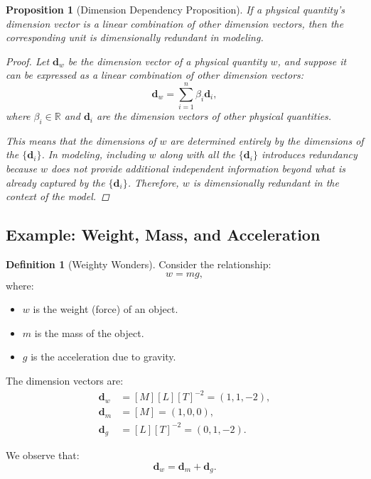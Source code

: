 \documentclass{article}
\newtheorem{proposition}{Proposition}[section]
\theoremstyle{definition}
\newtheorem{definition}{Definition}[section]
\theoremstyle{remark}
\begin{document}
	\begin{proposition}[Dimension Dependency Proposition]
		If a physical quantity's dimension vector is a linear combination of other dimension vectors, then the corresponding unit is \emph{dimensionally redundant} in modeling.
		
		\begin{proof}
			Let $\mathbf{d}_w$ be the dimension vector of a physical quantity $w$, and suppose it can be expressed as a linear combination of other dimension vectors:
			\[
			\mathbf{d}_w = \sum_{i=1}^{n} \beta_i \mathbf{d}_i,
			\]
			where $\beta_i \in \mathbb{R}$ and $\mathbf{d}_i$ are the dimension vectors of other physical quantities.
			
			This means that the dimensions of $w$ are determined entirely by the dimensions of the $\{ \mathbf{d}_i \}$. In modeling, including $w$ along with all the $\{ \mathbf{d}_i \}$ introduces redundancy because $w$ does not provide additional independent information beyond what is already captured by the $\{ \mathbf{d}_i \}$. Therefore, $w$ is dimensionally redundant in the context of the model.
		\end{proof}
	\end{proposition}
	
	\subsection{Example: Weight, Mass, and Acceleration}
	
	\begin{definition}[Weighty Wonders]
		Consider the relationship:
		\[
		w = m g,
		\]
		where:
		\begin{itemize}
			\item $w$ is the weight (force) of an object.
			\item $m$ is the mass of the object.
			\item $g$ is the acceleration due to gravity.
		\end{itemize}
	\end{definition}
	
	The dimension vectors are:
	\begin{align*}
		\mathbf{d}_w &= [M][L][T]^{-2} = (1,1,-2), \\
		\mathbf{d}_m &= [M] = (1,0,0), \\
		\mathbf{d}_g &= [L][T]^{-2} = (0,1,-2).
	\end{align*}
	
	We observe that:
	\[
	\mathbf{d}_w = \mathbf{d}_m + \mathbf{d}_g.
	\]
	
\end{document}
